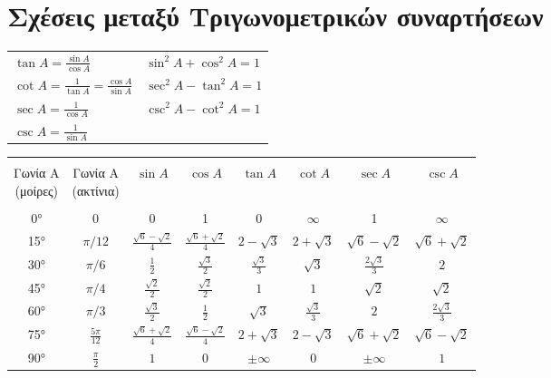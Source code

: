\section{Σχέσεις μεταξύ Τριγωνομετρικών συναρτήσεων}


\begin{tabular}{ll}
    $ \tan{A} = \frac{\sin{A}}{\cos{A}} $ & $ \sin^{2}{A} + \cos^{2}{A} =1 $ \\
    $ \cot{A} = \frac{1}{\tan{A}} = \frac{\cos{A}}{\sin{A}} $ & $
    \sec^{2}{A} - \tan^{2}{A} = 1 $ \\
    $ \sec{A} = \frac{1}{\cos{A}} $ & $ \csc^{2}{A} - \cot^{2}{A} =1 $ \\
    $ \csc{A} = \frac{1}{\sin{A}} $
\end{tabular}


\begin{table}
    \centering
\begin{tabular}{cccccccc}
    \toprule \\
    \minibox[c]{Γωνία Α \\ (μοίρες)} &  \minibox{Γωνία Α \\ (ακτίνια)} & $ \sin{A} $ & $ \cos{A} $ & $ \tan{A} $ &  $ \cot{A} $ & $ \sec{A} $ & $ \csc{A} $ \\
    \midrule \\
    \ang{0} & 0 & 0 & 1 & 0 & $\infty$ & 1 & $\infty$ \\
    \ang{15} & $ \pi / 12 $ & $ \frac{\sqrt{6} - \sqrt{2}}{4} $ & $ \frac{\sqrt{6} + \sqrt{2}}{4} $ & $ 2 - \sqrt{3} $ & $ 2 + \sqrt{3} $ & $ \sqrt{6} - \sqrt{2} $ & $ \sqrt{6} + \sqrt{2} $ \\
    \ang{30} & $ \pi / 6 $ & $ \frac{1}{2} $ & $ \frac{\sqrt{3}}{2} $ & $ \frac{\sqrt{3}}{3} $ & $ \sqrt{3} $ & $ \frac{2 \sqrt{3}}{3} $ & $2$ \\
    \ang{45} & $ \pi / 4 $ & $ \frac{\sqrt{2}}{2} $ & $ \frac{\sqrt{2}}{2} $ & $1$ & $1$ & $ \sqrt{2} $ & $ \sqrt{2} $ \\
    \ang{60} & $ \pi / 3 $ & $ \frac{\sqrt{3}}{2} $ & $ \frac{1}{2} $ & $ \sqrt{3} $ & $ \frac{\sqrt{3}}{3} $ & $ 2 $ & $ \frac{2 \sqrt{3}}{3} $ \\   
    \ang{75} & $ \frac{5 \pi}{12} $ & $ \frac{\sqrt{6} + \sqrt{2}}{4} $ & $ \frac{\sqrt{6} - \sqrt{2}}{4} $ & $ 2 + \sqrt{3} $ & $ 2 - \sqrt{3} $ & $ \sqrt{6} + \sqrt{2} $ &  $ \sqrt{6} - \sqrt{2} $ \\
    \ang{90} & $ \frac{\pi}{2} $ & $ 1 $ & $ 0 $ & $ \pm \infty $ & $ 0 $ & $ \pm \infty $ & $ 1 $ \\

\end{tabular}
\end{table}
